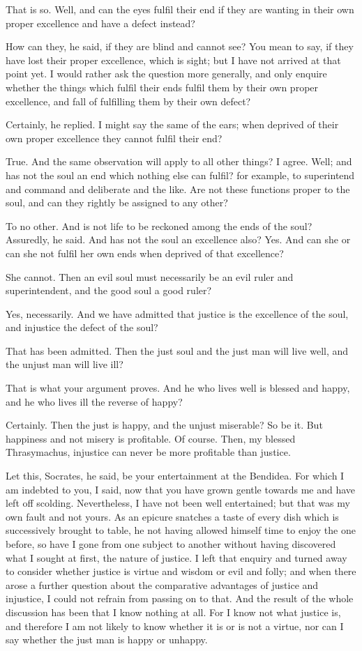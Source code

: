 That is so.
Well, and can the eyes fulfil their end if they are wanting in their own proper excellence and have a defect instead?

How can they, he said, if they are blind and cannot see?
You mean to say, if they have lost their proper excellence, which is sight; but I have not arrived at that point yet. I would rather ask the question more generally, and only enquire whether the things which fulfil their ends fulfil them by their own proper excellence, and fall of fulfilling them by their own defect?

Certainly, he replied.
I might say the same of the ears; when deprived of their own proper excellence they cannot fulfil their end?

True.
And the same observation will apply to all other things?
I agree.
Well; and has not the soul an end which nothing else can fulfil? for example, to superintend and command and deliberate and the like. Are not these functions proper to the soul, and can they rightly be assigned to any other?

To no other.
And is not life to be reckoned among the ends of the soul?
Assuredly, he said.
And has not the soul an excellence also?
Yes.
And can she or can she not fulfil her own ends when deprived of that excellence?

She cannot.
Then an evil soul must necessarily be an evil ruler and superintendent, and the good soul a good ruler?

Yes, necessarily.
And we have admitted that justice is the excellence of the soul, and injustice the defect of the soul?

That has been admitted.
Then the just soul and the just man will live well, and the unjust man will live ill?

That is what your argument proves.
And he who lives well is blessed and happy, and he who lives ill the reverse of happy?

Certainly.
Then the just is happy, and the unjust miserable?
So be it.
But happiness and not misery is profitable.
Of course.
Then, my blessed Thrasymachus, injustice can never be more profitable than justice.

Let this, Socrates, he said, be your entertainment at the Bendidea.
For which I am indebted to you, I said, now that you have grown gentle towards me and have left off scolding. Nevertheless, I have not been well entertained; but that was my own fault and not yours. As an epicure snatches a taste of every dish which is successively brought to table, he not having allowed himself time to enjoy the one before, so have I gone from one subject to another without having discovered what I sought at first, the nature of justice. I left that enquiry and turned away to consider whether justice is virtue and wisdom or evil and folly; and when there arose a further question about the comparative advantages of justice and injustice, I could not refrain from passing on to that. And the result of the whole discussion has been that I know nothing at all. For I know not what justice is, and therefore I am not likely to know whether it is or is not a virtue, nor can I say whether the just man is happy or unhappy.